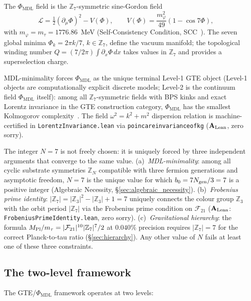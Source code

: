 \documentclass[11pt]{article}
\theoremstyle{remark}
\newcommand{\PHIMDL}{\Phi_{\mathrm{MDL}}}
\newcommand{\ZS}{\mathbb{Z}_7}
\newcommand{\ZZ}{\mathbb{Z}}
\newcommand{\lean}[1]{%
  \penalty-100
  \begingroup\def\_{\textunderscore\allowbreak}\texttt{#1}\endgroup}
\newcommand{\LL}{\mathcal{L}}
\newcommand{\FTT}{\mathcal{F}_{21}}
\newcommand{\CatAL}{\ensuremath{\textbf{A}_{\rm Lean}}}
\begin{document}
The $\PHIMDL$ field is the $\ZS$-symmetric sine-Gordon field
\begin{equation}
  \LL = \tfrac{1}{2}(\partial_\mu\Phi)^2 - V(\Phi),
  \qquad
  V(\Phi) = \frac{m_\varphi^2}{49}(1-\cos 7\Phi),
  \label{eq:lagrangian}
\end{equation}
with $m_\varphi = m_\tau = 1776.86$~MeV (Self-Consistency Condition, SCC~\cite{SpivackCMCA,SpivackPhiMDLField}).
The seven global minima $\Phi_k = 2\pi k/7$, $k\in\ZS$, define the vacuum
manifold; the topological winding number $Q = (7/2\pi)\int\partial_x\Phi\,dx$
takes values in $\ZS$ and provides a superselection charge.

MDL-minimality forces $\PHIMDL$ as the unique terminal Level-1 GTE object
(Level-1 objects are computationally explicit discrete models; Level-2 is
the continuum field $\PHIMDL$ itself):
among all $\ZS$-symmetric fields with BPS kinks and exact Lorentz invariance
in the GTE construction category, $\PHIMDL$ has the smallest
Kolmogorov complexity~\cite{SpivackCMCA}.  The field $\omega^2 = k^2 + m^2$
dispersion relation is machine-certified in \lean{LorentzInvariance.lean}
via \lean{poincare\_invariance\_of\_kg} ($\CatAL$, zero sorry).

The integer $N=7$ is not freely chosen: it is uniquely forced by three
independent arguments that converge to the same value.
(a)~\emph{MDL-minimality}: among all cyclic substrate symmetries $\ZZ_N$
compatible with three fermion generations and asymptotic freedom,
$N=7$ is the unique value for which $b_0 = 7N_{\rm gen}/3 = 7$ is a
positive integer (Algebraic Necessity, \S\ref{sec:algebraic_necessity}).
(b)~\emph{Frobenius prime identity}: $|\ZS| = |\ZZ_3|^2 - |\ZZ_3| + 1 = 7$
uniquely connects the colour group $\ZZ_3$ with the orbit period $|\ZS|$
via the Frobenius prime condition on $\FTT$ ($\CatAL$:
\lean{FrobeniusPrimeIdentity.lean}, zero sorry).
(c)~\emph{Gravitational hierarchy}: the formula
$M_{\rm Pl}/m_\tau = |\FTT|^{10}|\ZS|^7/2$ at $0.040\%$ precision
requires $|\ZS|=7$ for the correct Planck-to-tau ratio (\S\ref{sec:hierarchy}).
Any other value of $N$ fails at least one of these three constraints.

\subsection{The two-level framework}

The GTE/$\PHIMDL$ framework operates at two levels:
\end{document}
